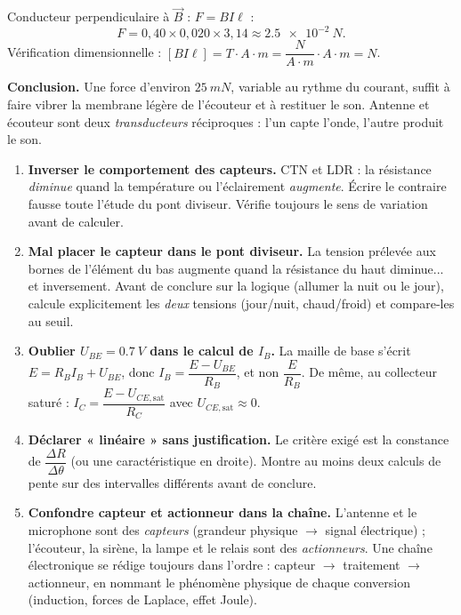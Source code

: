 \documentclass[11pt]{article}
\begin{document}
\begin{exoresolu}
Conducteur perpendiculaire à $\vec{B}$ : $F = B I \ell$ :
\[
F = 0{,}40 \times 0{,}020 \times 3{,}14 \approx \SI{2,5e-2}{N}.
\]
Vérification dimensionnelle : $[B I \ell] = T \cdot A \cdot m = \dfrac{N}{A \cdot m} \cdot A \cdot m = N$. \checkmark

\textbf{Conclusion.} Une force d'environ $\SI{25}{mN}$, variable au rythme du courant, suffit à faire vibrer la membrane légère de l'écouteur et à restituer le son. Antenne et écouteur sont deux \emph{transducteurs} réciproques : l'un capte l'onde, l'autre produit le son.
\end{exoresolu}

\begin{attention}
\begin{enumerate}
\item \textbf{Inverser le comportement des capteurs.} CTN et LDR : la résistance \emph{diminue} quand la température ou l'éclairement \emph{augmente}. Écrire le contraire fausse toute l'étude du pont diviseur. Vérifie toujours le sens de variation avant de calculer.
\item \textbf{Mal placer le capteur dans le pont diviseur.} La tension prélevée aux bornes de l'élément du bas augmente quand la résistance du haut diminue... et inversement. Avant de conclure sur la logique (allumer la nuit ou le jour), calcule explicitement les \emph{deux} tensions (jour/nuit, chaud/froid) et compare-les au seuil.
\item \textbf{Oublier $U_{BE} = \SI{0,7}{V}$ dans le calcul de $I_B$.} La maille de base s'écrit $E = R_B I_B + U_{BE}$, donc $I_B = \dfrac{E - U_{BE}}{R_B}$, et non $\dfrac{E}{R_B}$. De même, au collecteur saturé : $I_C = \dfrac{E - U_{CE,\text{sat}}}{R_C}$ avec $U_{CE,\text{sat}} \approx 0$.
\item \textbf{Déclarer « linéaire » sans justification.} Le critère exigé est la constance de $\dfrac{\Delta R}{\Delta \theta}$ (ou une caractéristique en droite). Montre au moins deux calculs de pente sur des intervalles différents avant de conclure.
\item \textbf{Confondre capteur et actionneur dans la chaîne.} L'antenne et le microphone sont des \emph{capteurs} (grandeur physique $\to$ signal électrique) ; l'écouteur, la sirène, la lampe et le relais sont des \emph{actionneurs}. Une chaîne électronique se rédige toujours dans l'ordre : capteur $\to$ traitement $\to$ actionneur, en nommant le phénomène physique de chaque conversion (induction, forces de Laplace, effet Joule).
\end{enumerate}
\end{attention}
\end{document}

